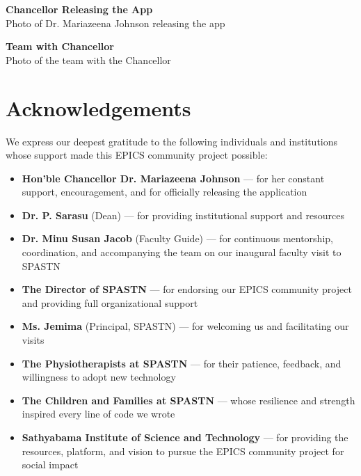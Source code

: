 \documentclass[11pt,a4paper]{article}
\begin{document}
\begin{minipage}{0.48\textwidth}
    \begin{photoplaceholder}[height=5cm]
        \vspace{1.5cm}
        {\small\bfseries Chancellor Releasing the App}\\[0.2cm]
        {\footnotesize Photo of Dr. Mariazeena Johnson releasing the app}
    \end{photoplaceholder}
\end{minipage}
\hfill
\begin{minipage}{0.48\textwidth}
    \begin{photoplaceholder}[height=5cm]
        \vspace{1.5cm}
        {\small\bfseries Team with Chancellor}\\[0.2cm]
        {\footnotesize Photo of the team with the Chancellor}
    \end{photoplaceholder}
\end{minipage}

\section{Acknowledgements}

We express our deepest gratitude to the following individuals and institutions whose support made this EPICS community project possible:

\begin{itemize}[leftmargin=2em, itemsep=4pt]
    \item \textbf{Hon'ble Chancellor Dr. Mariazeena Johnson} --- for her constant support, encouragement, and for officially releasing the application
    \item \textbf{Dr. P. Sarasu} (Dean) --- for providing institutional support and resources
    \item \textbf{Dr. Minu Susan Jacob} (Faculty Guide) --- for continuous mentorship, coordination, and accompanying the team on our inaugural faculty visit to SPASTN
    \item \textbf{The Director of SPASTN} --- for endorsing our EPICS community project and providing full organizational support
    \item \textbf{Ms. Jemima} (Principal, SPASTN) --- for welcoming us and facilitating our visits
    \item \textbf{The Physiotherapists at SPASTN} --- for their patience, feedback, and willingness to adopt new technology
    \item \textbf{The Children and Families at SPASTN} --- whose resilience and strength inspired every line of code we wrote
    \item \textbf{Sathyabama Institute of Science and Technology} --- for providing the resources, platform, and vision to pursue the EPICS community project for social impact
\end{itemize}
\end{document}
